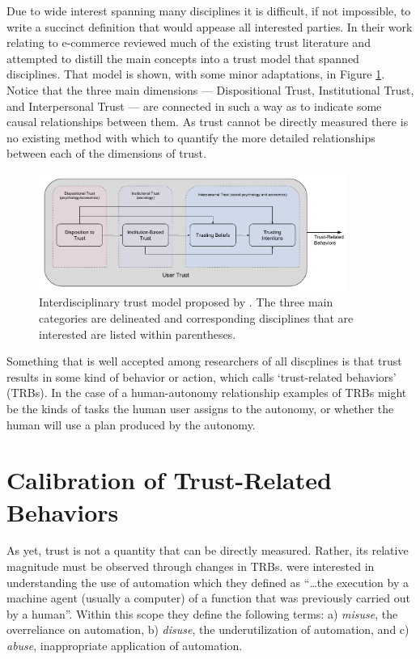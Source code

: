     Due to wide interest spanning many disciplines it is difficult, if not impossible, to write a succinct definition that would appease all interested parties. In their work relating to e-commerce \citet{McKnight2001-fa} reviewed much of the existing trust literature and attempted to distill the main concepts into a trust model that spanned disciplines. That model is shown, with some minor adaptations, in Figure \ref{fig:UserTrust}. Notice that the three main dimensions --- Dispositional Trust, Institutional Trust, and Interpersonal Trust --- are connected in such a way as to indicate some causal relationships between them. As trust cannot be directly measured there is no existing method with which to quantify the more detailed relationships between each of the dimensions of trust.

	\begin{figure}[htbp]
    	\centering
     	\includegraphics[width=0.9\textwidth]{Figures/UserTrust}
    	\caption{Interdisciplinary trust model proposed by \citet{McKnight2001-fa}. The three main categories are delineated and corresponding disciplines that are interested are listed within parentheses.}
        \label{fig:UserTrust}
    \end{figure}

    Something that is well accepted among researchers of all discplines is that trust results in some kind of behavior or action, which \citet{McKnight2001-fa} calls `trust-related behaviors' (TRBs). In the case of a human-autonomy relationship examples of TRBs might be the kinds of tasks the human user assigns to the autonomy, or whether the human will use a plan produced by the autonomy.

\section{Calibration of Trust-Related Behaviors}
    As yet, trust is not a quantity that can be directly measured. Rather, its relative magnitude must be observed through changes in TRBs. \citet{Parasuraman1997-co} were interested in understanding the use of automation which they defined as ``\ldots the execution by a machine agent (usually a computer) of a function that was previously carried out by a human''. Within this scope they define the following terms: a) \emph{misuse}, the overreliance on automation, b) \emph{disuse}, the underutilization of automation, and c) \emph{abuse}, inappropriate application of automation.

